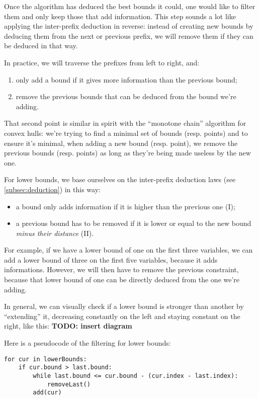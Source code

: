 \documentclass[a4paper,10pt]{article}
\begin{document}
Once the algorithm has deduced the best bounds it could, one would like to filter them and only keep those that add information. This step sounds a lot like applying the inter-prefix deduction in reverse: instead of creating new bounds by deducing them from the next or previous prefix, we will remove them if they can be deduced in that way.

In practice, we will traverse the prefixes from left to right, and:
\begin{enumerate}
    \item only add a bound if it gives more information than the previous bound;
    \item remove the previous bounds that can be deduced from the bound we're adding.
\end{enumerate}

That second point is similar in spirit with the ``monotone chain'' algorithm for convex hulls: we're trying to find a minimal set of bounds (resp. points) and to ensure it's minimal, when adding a new bound (resp. point), we remove the previous bounds (resp. points) as long as they're being made useless by the new one.

For lower bounds, we base ourselves on the inter-prefix deduction laws (see \ref{subsec:deduction}) in this way:
\begin{itemize}
    \item a bound only adds information if it is higher than the previous one (I);
    \item a previous bound has to be removed if it is lower or equal to the new bound \emph{minus their distance} (II).
\end{itemize}

For example, if we have a lower bound of one on the first three variables, we can add a lower bound of three on the first five variables, because it adds informations. However, we will then have to remove the previous constraint, because that lower bound of one can be directly deduced from the one we're adding.

In general, we can visually check if a lower bound is stronger than another by ``extending'' it, decreasing constantly on the left and staying constant on the right, like this: \textbf{TODO: insert diagram}

Here is a pseudocode of the filtering for lower bounds:
\begin{lstlisting}
for cur in lowerBounds:
    if cur.bound > last.bound:
        while last.bound <= cur.bound - (cur.index - last.index):
            removeLast()
        add(cur)
\end{lstlisting}
\end{document}
